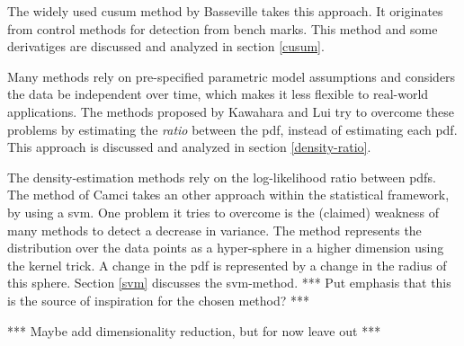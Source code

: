 The widely used \gls{cusum} method by Basseville \etal \cite{basseville1993detection} takes this approach.
It originates from control methods for detection from bench marks.
This method and some derivatiges are discussed and analyzed in section \ref{cusum}.

Many methods rely on pre-specified parametric model assumptions and considers the data be independent over time, which makes it less flexible to real-world applications.
The methods proposed by Kawahara \etal \cite{kawahara2009change} and Lui \etal \cite{liu2013change} try to overcome these problems by estimating the \emph{ratio} between the \gls{pdf}, instead of estimating each \gls{pdf}.
This approach is discussed and analyzed in section \ref{density-ratio}.

The density-estimation methods rely on the log-likelihood ratio between \glspl{pdf}.
The method of Camci \cite{camci2010change} takes an other approach within the statistical framework, by using a \gls{svm}.
One problem it tries to overcome is the (claimed) weakness of many methods to detect a decrease in variance.
The method represents the distribution over the data points as a hyper-sphere in a higher dimension using the kernel trick.
A change in the \gls{pdf} is represented by a change in the radius of this sphere.
Section \ref{svm} discusses the \gls{svm}-method.
*** Put emphasis that this is the source of inspiration for the chosen method? ***


*** Maybe add dimensionality reduction, but for now leave out ***









% 
